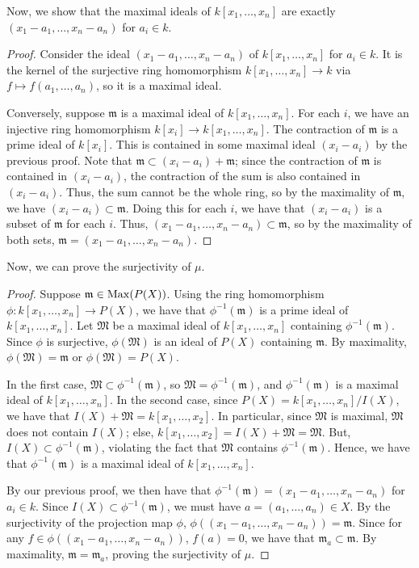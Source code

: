 Now, we show that the maximal ideals of $k[x_1,\ldots,x_n]$ are exactly $(x_1 - a_1,\ldots,x_n - a_n)$ for $a_i \in k$.
\begin{proof}
Consider the ideal $(x_1 - a_1, \ldots, x_n - a_n)$ of $k[x_1,\ldots,x_n]$ for $a_i \in k$. It is the kernel of the surjective ring homomorphism $k[x_1,\ldots,x_n] \to k$ via $f \mapsto f(a_1,\ldots,a_n)$,
so it is a maximal ideal. 

Conversely, suppose $\mathfrak{m}$ is a maximal ideal of $k[x_1,\ldots,x_n]$. For each $i$, we have an injective ring homomorphism $k[x_i] \to k[x_1,\ldots,x_n]$. The contraction of $\mathfrak{m}$ is
a prime ideal of $k[x_i]$. This is contained in some maximal ideal $(x_i - a_i)$ by the previous proof. Note that $\mathfrak{m} \subset (x_i - a_i) + \mathfrak{m}$; since the contraction of $\mathfrak{m}$ is 
contained in $(x_i - a_i)$, the contraction of the sum is also contained in $(x_i - a_i)$. Thus, the sum cannot be the whole ring, so by the maximality of $\mathfrak{m}$, we have $(x_i - a_i) \subset \mathfrak{m}$.
Doing this for each $i$, we have that $(x_i - a_i)$ is a subset of $\mathfrak{m}$ for each $i$. Thus, $(x_1 - a_1,\ldots,x_n - a_n) \subset \mathfrak{m}$, so by the maximality of both sets,
$\mathfrak{m} = (x_1 - a_1,\ldots,x_n - a_n)$.
\end{proof}

Now, we can prove the surjectivity of $\mu$.

\begin{proof}
Suppose $\mathfrak{m} \in \operatorname{Max}(P(X))$. Using the ring homomorphism $\phi : k[x_1,\ldots,x_n] \to P(X)$, we have that $\phi^{-1}(\mathfrak{m})$ is a prime ideal of $k[x_1,\ldots,x_n]$. Let $\mathfrak{M}$
be a maximal ideal of $k[x_1,\ldots,x_n]$ containing $\phi^{-1}(\mathfrak{m})$. Since $\phi$ is surjective, $\phi(\mathfrak{M})$ is an ideal of $P(X)$ containing $\mathfrak{m}$. By maximality, $\phi(\mathfrak{M}) = \mathfrak{m}$
or $\phi(\mathfrak{M}) = P(X)$. 

In the first case, $\mathfrak{M} \subset \phi^{-1}(\mathfrak{m})$, so $\mathfrak{M} = \phi^{-1}(\mathfrak{m})$, and $\phi^{-1}(\mathfrak{m})$ is a maximal ideal of $k[x_1,\ldots,x_n]$. In the second case,
since $P(X) = k[x_1,\ldots,x_n] / I(X)$, we have that $I(X) + \mathfrak{M} = k[x_1,\ldots,x_2]$. In particular, since $\mathfrak{M}$ is maximal, $\mathfrak{M}$ does not contain $I(X)$; else, 
$k[x_1,\ldots,x_2] = I(X) + \mathfrak{M} = \mathfrak{M}$. But, $I(X) \subset \phi^{-1}(\mathfrak{m})$, violating the fact that $\mathfrak{M}$ contains $\phi^{-1}(\mathfrak{m})$. Hence, we have
that $\phi^{-1}(\mathfrak{m})$ is a maximal ideal of $k[x_1,\ldots,x_n]$.

By our previous proof, we then have that $\phi^{-1}(\mathfrak{m}) = (x_1 - a_1, \ldots, x_n - a_n)$ for $a_i \in k$. Since $I(X) \subset \phi^{-1}(\mathfrak{m})$, we must have $a = (a_1,\ldots,a_n) \in X$. By
the surjectivity of the projection map $\phi$, $\phi((x_1 - a_1, \ldots, x_n - a_n)) = \mathfrak{m}$. Since for any $f \in \phi((x_1 - a_1, \ldots, x_n - a_n))$, $f(a) = 0$, we have that $\mathfrak{m}_a \subset \mathfrak{m}$.
By maximality, $\mathfrak{m} = \mathfrak{m}_a$, proving the surjectivity of $\mu$.
\end{proof}

